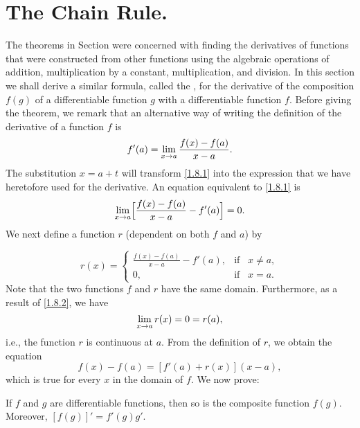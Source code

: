 \section{The Chain Rule.}\label{sec 1.8}
The theorems in Section 
were concerned with finding
the derivatives of functions that were constructed from other functions
using the algebraic operations of addition,
multiplication by a constant, multiplication, 
and division.
In this section we shall derive a similar formula,
called the , 
for the derivative of the composition $f(g)$
of a differentiable function $g$ with a differentiable function $f$.
Before giving the theorem,
we remark that an alternative way
of writing the definition of the derivative of a function $f$ is
\begin{equation}
f'(a) = \lim_{x \rightarrow a}\frac{f(x) - f(a)}{x - a} . 
\label{eq1.8.1}
\end{equation}
The substitution $x = a + t$
will transform \eqref{1.8.1}
into the expression that we have heretofore used for the derivative.
An equation equivalent to \eqref{1.8.1} is
$$
\lim_{x \rightarrow a} \Bigl[ \frac{f(x)- f(a)}{x-a} - f'(a) \Bigr] = 0.
$$
We next define a function $r$ (dependent on both $f$ and $a$) by

\begin{equation}
r(x) = \left \{ \begin{array}{ll}
\frac{f(x) - f(a)}{x - a} - f'(a), & \mbox{if}\;\;\; x \neq a,\\
                                0, & \mbox{if}\;\;\; x = a.
\end{array}
\right.
\label{eq1.8.2}
\end{equation}
Note that the two functions $f$ and $r$ have the same domain.
Furthermore, as a result of \eqref{1.8.2},
we have
$$
\lim_{x \rightarrow a} r(x) = 0 = r(a),  
$$
i.e., the function $r$ is continuous at $a$.
From the definition of $r$,
we obtain the equation
\begin{equation}
f(x) - f(a) = [f'(a) + r(x)] (x - a),   
\label{eq1.8.3}
\end{equation}
which is true for every $x$ in the domain of $f$. We now prove:

\begin{prop}
\label{thm 1.8.1}
If $f$ and $g$ are differentiable functions,
then so is the composite function $f(g)$. Moreover, $[f(g)]' = f'(g)g'$. 
\end{prop}

